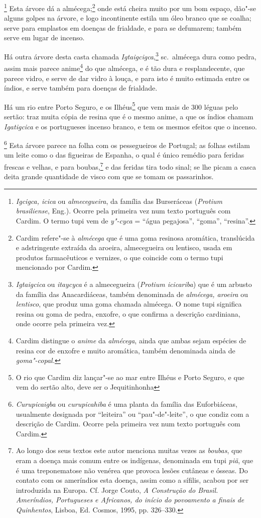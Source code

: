 \begin{linenumbers}
\footnote{ \textit{Igcigca, icica} ou
\textit{almecegueira}, da família das Burseráceas (\textit{Protium
brasiliense}, Eng.). Ocorre pela primeira vez num texto português com
Cardim. O termo tupi vem de \textit{y"-cyca} = ``água pegajosa'', ``goma'',
``resina''.} Esta árvore dá a almécega;\footnote{ Cardim
refere"-se à \textit{almécega} que é uma goma resinosa aromática,
translúcida e adstringente extraída da aroeira, almecegueira ou
lentisco, usada em produtos farmacêuticos e vernizes, o que coincide
com o termo tupi mencionado por Cardim.} onde está cheira muito por um
bom espaço, dão"-se alguns golpes na árvore, e logo incontinente estila
um óleo branco que se coalha; serve para emplastos em doenças de
frialdade, e para se defumarem; também serve em lugar de incenso.

 Há outra árvore desta casta chamada \textit{Igtaigcigca},\footnote{ \textit{Igtaigcica} 
ou \textit{itaycyca} é a almecegueira
(\textit{Protium icicariba}) que é um arbusto da família das
Anacardiáceas, também denominada de \textit{almécega, aroeira} ou
\textit{lentisco}, que produz uma goma chamada almécega. O nome tupi
significa resina ou goma de pedra, enxofre, o que confirma a descrição
cardiniana, onde ocorre pela primeira vez.} sc.~almécega dura como
pedra, assim mais parece anime\footnote{ Cardim distingue o
\textit{anime} da \textit{almécega}, ainda que ambas sejam espécies de
resina cor de enxofre e muito aromática, também denominada ainda de
\textit{goma"-copal.}} do que almécega, e é tão dura e resplandecente,
que parece vidro, e serve de dar vidro à louça, e para isto é muito
estimada entre os índios, e serve também para doenças de frialdade.

 Há um rio entre Porto Seguro, e os Ilhéus\footnote{ O rio que Cardim
diz lançar"-se ao mar entre Ilhéus e Porto Seguro, e que vem do sertão
alto, deve ser o Jequitinhonha} que vem mais de 300 léguas
pelo sertão: traz muita cópia de resina que é o mesmo anime, a que os
índios chamam \textit{Igatigcica} e os portugueses incenso branco, e
tem os mesmos efeitos que o incenso.

\footnote{ \textit{Curupicaigba} ou
\textit{curupicahiba} é uma planta da família das Euforbiáceas,
usualmente designada por ``leiteira'' ou ``pau"-de"-leite'', o que condiz
com a descrição de Cardim. Ocorre pela primeira vez num texto português
com Cardim.} Esta árvore parece na folha com os pessegueiros
de Portugal; as folhas estilam um leite como o das figueiras de
Espanha, o qual é único remédio para feridas frescas e velhas, e para
boubas,\footnote{ Ao longo dos seus textos este autor menciona muitas
vezes as \textit{boubas}, que eram a doença mais comum entre os
indígenas, denominada em tupi \textit{piã}, que é uma treponematose não
venérea que provoca lesões cutâneas e ósseas. Do contato com os
ameríndios esta doença, assim como a sífilis, acabou por ser introduzida na
Europa. Cf. Jorge Couto, \textit{A Construção do Brasil. Ameríndios,
Portugueses e Africanos, do início do povoamento a finais de
Quinhentos}, Lisboa, Ed. Cosmos, 1995, pp. 326--330.} e das feridas
tira todo sinal; se lhe picam a casca deita grande quantidade de visco
com que se tomam os passarinhos.


\end{linenumbers}
